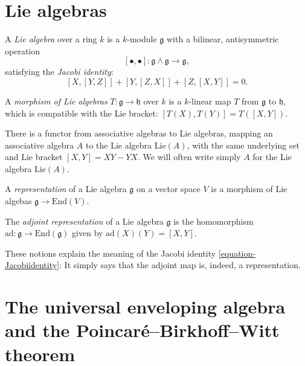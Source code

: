\section{Lie algebras}
\label{section-Liealgebras}

\begin{definition}
\label{definition-Liealgebra}
A {\it Lie algebra} over a ring $k$ is a $k$-module $\mathfrak g$ with a bilinear, antisymmetric operation 
$$[\bullet,\bullet]: \mathfrak g \wedge \mathfrak g \to \mathfrak g,$$ 
satisfying the {\it Jacobi identity}:
\begin{equation} 
\label{equation-Jacobiidentity}
[X,[Y,Z]] + [Y,[Z,X]] + [Z,[X,Y]] = 0. 
\end{equation}

A {\it morphism of Lie algebras} $T:\mathfrak g \to \mathfrak h$ over $k$ is a $k$-linear map $T$ from $\mathfrak g$ to $\mathfrak h$, which is compatible with the Lie bracket: $[T(X), T(Y)] = T([X,Y])$.
\end{definition}

There is a functor from associative algebras to Lie algebras, mapping an associative algebra $A$ to the Lie algebra $\text{Lie}(A)$, with the same underlying set and Lie bracket $[X,Y]=XY-YX$. We will often write simply $A$ for the Lie algebra $\text{Lie}(A)$.

\begin{definition}
 \label{definition-representation-Liealgebra}
A {\it representation} of a Lie algebra $\mathfrak g$ on a vector space $V$ is a morphism of Lie algebas $\mathfrak g \to \text{End}(V)$. 
\end{definition}

\begin{definition}
 \label{definition-adjoint-representation-Liealgebra}
The {\it adjoint representation} of a Lie algebra $\mathfrak g$ is the homomorphism $\text{ad}:\mathfrak g\to \text{End}(\mathfrak g)$ given by $\text{ad}(X)(Y)=[X,Y]$.
\end{definition}


\begin{remark}
\label{remark-Jacobiidentity}
These notions explain the meaning of the Jacobi identity \eqref{equation-Jacobiidentity}: It simply says that the adjoint map is, indeed, a representation.
\end{remark}

\section{The universal enveloping algebra and the Poincar\'e--Birkhoff--Witt theorem}
\label{section-enveloping}

